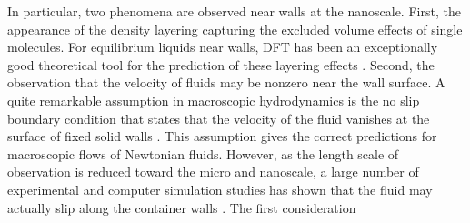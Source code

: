 \documentclass[b5paper,openright,10pt]{book}
\newcommand{\Note}[1]{{\bf \color{red}#1}}    %
\begin{document}
In  particular,  two phenomena  are
observed near  walls at the  nanoscale.  First, the appearance  of the
density  layering  capturing the  excluded  volume  effects of  single
molecules.   For equilibrium  liquids near  walls, 
DFT has  been an exceptionally good theoretical  tool for the
prediction of  these layering effects \cite{Hansen2013}.   Second, the
observation that the velocity of fluids  may be nonzero near the wall
surface.
A quite remarkable  assumption in macroscopic hydrodynamics  is the no
slip boundary  condition that  states that the  velocity of  the fluid
vanishes  at the  surface of  fixed solid  walls \cite{Batcherlor1967}.
This assumption gives the correct predictions for macroscopic flows of
Newtonian  fluids.  However,  as the  length scale  of observation  is
reduced  toward   the  micro  and   nanoscale,  a  large   number  of
experimental   \cite{Lauga2005}   and  computer   simulation   studies
\cite{Koplik1995} has shown that the fluid may actually slip along the
container walls  \cite{KarniadakisBook2005}.  The  first consideration
\end{document}
